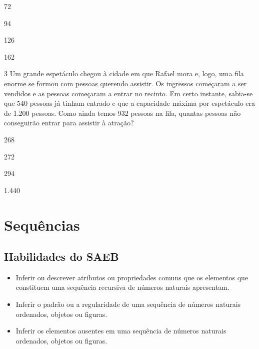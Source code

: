 \begin{minipage}{.5\textwidth}
\begin{escolha}
\item
  72
\item
  94
\item
  126
\item
  162
\end{escolha}
\end{minipage}


\num{3} Um grande espetáculo chegou à cidade em que Rafael mora e, logo, uma fila
enorme se formou com pessoas querendo assistir. Os
ingressos começaram a ser vendidos e as pessoas começaram a entrar no
recinto. Em certo instante, sabia-se que 540 pessoas já tinham
entrado e que a capacidade máxima por espetáculo era de 1.200 pessoas. Como ainda temos 932 pessoas na fila, quantas pessoas não
conseguirão entrar para assistir à atração?\medskip

\begin{minipage}{.5\textwidth}
\begin{escolha}
\item
  268
\item
  272
\item
  294
\item
  1.440
\end{escolha}
\end{minipage}


\chapter{Sequências}

\section{Habilidades do SAEB}

\begin{itemize}
\item Inferir ou descrever atributos ou propriedades comuns que os elementos
que constituem uma sequência recursiva de números naturais apresentam.

\item Inferir o padrão ou a regularidade de uma sequência de números
naturais ordenados, objetos ou figuras.

\item Inferir os elementos ausentes em uma sequência de números naturais
ordenados, objetos ou figuras.
\end{itemize}


